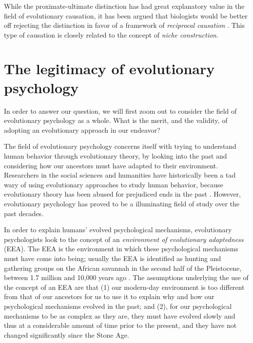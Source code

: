 While the proximate-ultimate distinction has had great explanatory value in the field of evolutionary causation, it has been argued that biologists would be better off rejecting the distinction in favor of a framework of \emph{reciprocal causation} \citep{Laland13}. This type of causation is closely related to the concept of \emph{niche construction}.

\section{The legitimacy of evolutionary psychology}

In order to answer our question, we will first zoom out to consider the field of evolutionary psychology as a whole. What is the merit, and the validity, of adopting an evolutionary approach in our endeavor?

The field of evolutionary psychology concerns itself with trying to understand human behavior through evolutionary theory, by looking into the past and considering how our ancestors must have adapted to their environment.
Researchers in the social sciences and humanities have historically been a tad wary of using evolutionary approaches to study human behavior, because evolutionary theory has been abused for prejudiced ends in the past \citep[pp.~19--20]{LB02}. However, evolutionary psychology has proved to be a illuminating field of study over the past decades.

In order to explain humans' evolved psychological mechanisms, evolutionary psychologists look to the concept of an \emph{environment of evolutionary adaptedness} (EEA). The EEA is the environment in which these psychological mechanisms must have come into being; usually the EEA is identified as hunting and gathering groups on the African savannah in the second half of the Pleistocene, between 1.7 million and 10,000 years ago \citep{LB02}.
The assumptions underlying the use of the concept of an EEA are that (1) our modern-day environment is too different from that of our ancestors for us to use it to explain why and how our psychological mechanisms evolved in the past; and (2), for our psychological mechanisms to be as complex as they are, they must have evolved slowly and thus at a considerable amount of time prior to the present, and they have not changed significantly since the Stone Age.

